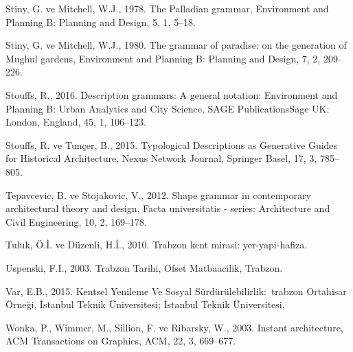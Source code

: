 \documentclass[12pt,turkish,a4paperpaper,]{report}
\begin{document}
\leavevmode\hypertarget{ref-Stiny:1978cl}{}%
Stiny, G. ve Mitchell, W.J., 1978. The Palladian grammar, Environment
and Planning B: Planning and Design, 5, 1, 5--18.

\leavevmode\hypertarget{ref-Stiny:1980dya}{}%
Stiny, G. ve Mitchell, W.J., 1980. The grammar of paradise: on the
generation of Mughul gardens, Environment and Planning B: Planning and
Design, 7, 2, 209--226.

\leavevmode\hypertarget{ref-Stouffs:2016ip}{}%
Stouffs, R., 2016. Description grammars: A general notation: Environment
and Planning B: Urban Analytics and City Science, SAGE PublicationsSage
UK: London, England, 45, 1, 106--123.

\leavevmode\hypertarget{ref-Stouffs:2015if}{}%
Stouffs, R. ve Tunçer, B., 2015. Typological Descriptions as Generative
Guides for Historical Architecture, Nexus Network Journal, Springer
Basel, 17, 3, 785--805.

\leavevmode\hypertarget{ref-Tepavcevic:2012bl}{}%
Tepavcevic, B. ve Stojakovic, V., 2012. Shape grammar in contemporary
architectural theory and design, Facta universitatis - series:
Architecture and Civil Engineering, 10, 2, 169--178.

\leavevmode\hypertarget{ref-Tuluk:2010ud}{}%
Tuluk, Ö.İ. ve Düzenli, H.İ., 2010. Trabzon kent mirasi:
yer-yapi-hafiza.

\leavevmode\hypertarget{ref-Uspenski:2003ta}{}%
Uspenski, F.I., 2003. Trabzon Tarihi, Ofset Matbaacilik, Trabzon.

\leavevmode\hypertarget{ref-Var:2015vx}{}%
Var, E.B., 2015. Kentsel Yenileme Ve Sosyal Sürdürülebilirlik:~trabzon
Ortahisar Örneği, İstanbul Teknik Üniversitesi; İstanbul Teknik
Üniversitesi.

\leavevmode\hypertarget{ref-Wonka:2003bn}{}%
Wonka, P., Wimmer, M., Sillion, F. ve Ribarsky, W., 2003. Instant
architecture, ACM Transactions on Graphics, ACM, 22, 3, 669--677.
\end{document}

